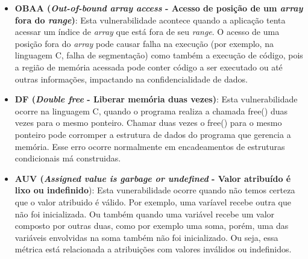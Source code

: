 \begin{itemize}
\item \textbf{OBAA (\emph{Out-of-bound array access } - Acesso de posição de um \emph{array} fora do \emph{range})}:
%
Esta vulnerabilidade acontece quando a aplicação tenta acessar um índice de \emph{array} que está fora de seu \emph{range}. O acesso de uma posição fora do \emph{array} pode causar falha na execução (por exemplo, na linguagem C, falha de segmentação) como também a execução de código, pois a região de memória acessada pode conter código a ser executado ou até outras informações, impactando na confidencialidade de dados.

\item \textbf{DF (\emph{Double free } - Liberar memória duas vezes)}:
%
Esta vulnerabilidade ocorre na linguagem C, quando o programa realiza a chamada free() duas vezes para o mesmo ponteiro. Chamar duas vezes o free() para o mesmo ponteiro pode corromper a estrutura de dados do programa que gerencia a memória. Esse erro ocorre normalmente em encadeamentos de estruturas condicionais má construidas.

\item \textbf{AUV (\emph{Assigned value is garbage or undefined} - Valor atribuído é lixo ou indefinido}):
%
Esta vunerabilidade ocorre quando não temos certeza que o valor atribuido é válido. Por exemplo, uma varíavel recebe outra que não foi inicializada. Ou também quando uma variável recebe um valor composto por outras duas, como por exemplo uma soma, porém, uma das variáveis envolvidas na soma também não foi inicializado. Ou seja, essa métrica está relacionada a atribuições com valores inválidos ou indefinidos.

\end{itemize}

%


